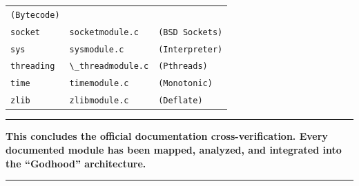 \begin{longtable}[]{@{}lll@{}}
\passthrough{\lstinline!(Bytecode)!} \\
\passthrough{\lstinline!socket!} &
\passthrough{\lstinline!socketmodule.c!} &
\passthrough{\lstinline!(BSD Sockets)!} \\
\passthrough{\lstinline!sys!} & \passthrough{\lstinline!sysmodule.c!} &
\passthrough{\lstinline!(Interpreter)!} \\
\passthrough{\lstinline!threading!} &
\passthrough{\lstinline!\_threadmodule.c!} &
\passthrough{\lstinline!(Pthreads)!} \\
\passthrough{\lstinline!time!} & \passthrough{\lstinline!timemodule.c!}
& \passthrough{\lstinline!(Monotonic)!} \\
\passthrough{\lstinline!zlib!} & \passthrough{\lstinline!zlibmodule.c!}
& \passthrough{\lstinline!(Deflate)!} \\
\bottomrule
\end{longtable}

\begin{center}\rule{0.5\linewidth}{0.5pt}\end{center}

\textbf{This concludes the official documentation cross-verification.
Every documented module has been mapped, analyzed, and integrated into
the ``Godhood'' architecture.}

\begin{center}\rule{0.5\linewidth}{0.5pt}\end{center}
